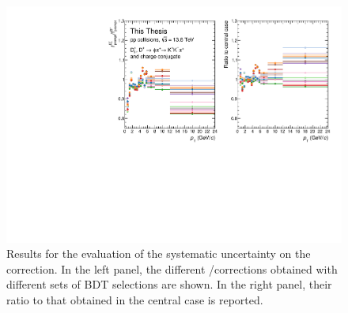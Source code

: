 \begin{figure}[htb]
    \begin{center}
    \includegraphics[width=\textwidth]{Figures/Chapter 6/PromptFracSyst.pdf}
    \caption{Results for the evaluation of the systematic uncertainty on the \fp correction. In the left panel, the different \fpds/\fpdpl corrections obtained with different sets of BDT selections are shown. In the right panel, their ratio to that obtained in the central case is reported.}
    \label{fig:fp_syst} 
    \end{center}
\end{figure}


